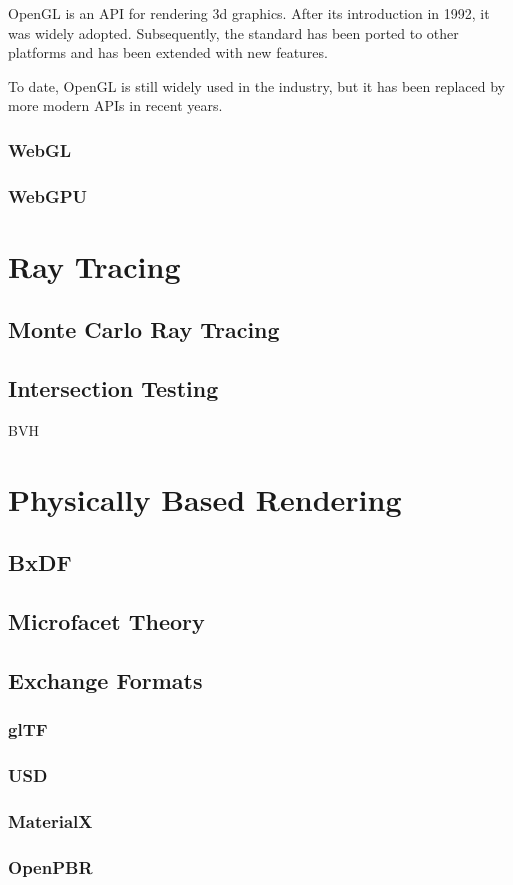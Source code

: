 OpenGL is an API for rendering 3d graphics. After its introduction in 1992, it was widely adopted. Subsequently, the standard has been ported to other platforms and has been extended with new features.

To date, OpenGL is still widely used in the industry, but it has been replaced by more modern APIs in recent years.

\subsubsection{WebGL}
\subsubsection{WebGPU}

\section{Ray Tracing}
\subsection{Monte Carlo Ray Tracing}
\subsection{Intersection Testing}
BVH

\section{Physically Based Rendering}
\subsection{BxDF}
\subsection{Microfacet Theory}
\subsection{Exchange Formats}
\subsubsection{glTF}
\subsubsection{USD}

\subsubsection{MaterialX}
\subsubsection{OpenPBR}

